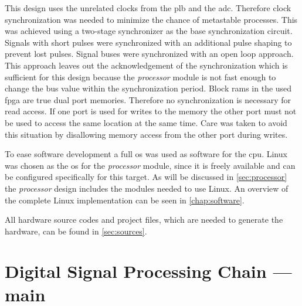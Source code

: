 \documentclass[12pt,a4paper,parskip=full,abstract=true,BCOR=12mm]{scrreprt}
\def\device#1{\mbox{\textit{#1}}}
\begin{document}
This design uses the unrelated clocks from the \gls{plb} and the \gls{adc}.
Therefore clock synchronization was needed to minimize the chance of metastable
processes. This was achieved using a two-stage synchronizer as the base
synchronization circuit. Signals with short pulses were synchronized with an
additional pulse shaping to prevent lost pulses. Signal buses were synchronized
with an open loop approach. This approach leaves out the acknowledgement of the
synchronization which is sufficient for this design because the
\device{processor} module is not fast enough to change the bus value within the
synchronization period. Block \glspl{ram} in the used \gls{fpga} are true dual port
memories. Therefore no synchronization is necessary for read access. If one port
is used for writes to the memory the other port must not be used to access the same location at the same
time\cite{virtex5}. Care was taken to avoid this situation by disallowing
memory access from the other port during writes.

To ease software development a full \gls{os} was used as software for the
\gls{cpu}. Linux was chosen as the \gls{os} for the \device{processor} module, since
it is freely available and can be configured specifically for this target. As will
be discussed in \cref{sec:processor} the \device{processor} design includes the modules
needed to use Linux. An overview of the complete Linux implementation
can be seen in \cref{chap:software}.

All hardware source codes and project files, which are needed to generate the hardware, can
be found in \cref{sec:sources}.


\section[Digital Signal Processing Chain]{Digital Signal Processing Chain --- main}
\label{sec:digital_processing}
\end{document}
